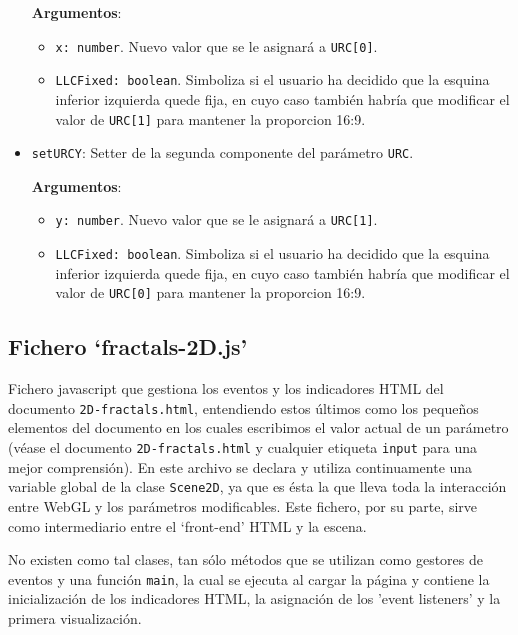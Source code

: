 \begin{itemize}
    \textbf{Argumentos}:
    
    \begin{itemize}
        \item \verb|x: number|. Nuevo valor que se le asignará a \verb|URC[0]|.
        \item \verb|LLCFixed: boolean|. Simboliza si el usuario ha decidido que la esquina inferior izquierda quede fija, en cuyo caso también habría que modificar el valor de \verb|URC[1]| para mantener la proporcion 16:9.
    \end{itemize}
    \item \verb|setURCY|: Setter de la segunda componente del parámetro \verb|URC|.
    
    \textbf{Argumentos}:
    
    \begin{itemize}
        \item \verb|y: number|. Nuevo valor que se le asignará a \verb|URC[1]|.
        \item \verb|LLCFixed: boolean|. Simboliza si el usuario ha decidido que la esquina inferior izquierda quede fija, en cuyo caso también habría que modificar el valor de \verb|URC[0]| para mantener la proporcion 16:9.
    \end{itemize}

\end{itemize}

\subsection{Fichero `fractals-2D.js'}

Fichero javascript que gestiona los eventos y los indicadores HTML del documento \verb|2D-fractals.html|, entendiendo estos últimos como los pequeños elementos del documento en los cuales escribimos el valor actual de un parámetro (véase el documento \verb|2D-fractals.html| y cualquier etiqueta \verb|input| para una mejor comprensión). En este archivo se declara y utiliza continuamente una variable global de la clase \verb|Scene2D|, ya que es ésta la que lleva toda la interacción entre WebGL y los parámetros modificables. Este fichero, por su parte, sirve como intermediario entre el `front-end' HTML y la escena.

No existen como tal clases, tan sólo métodos que se utilizan como gestores de eventos y una función \verb|main|, la cual se ejecuta al cargar la página y contiene la inicialización de los indicadores HTML, la asignación de los 'event listeners' y la primera visualización.

